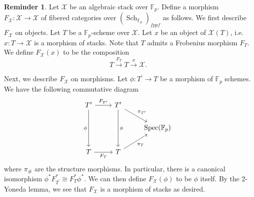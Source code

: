 \documentclass[11pt]{amsart}
\theoremstyle{plain}
\theoremstyle{definition}
\newtheorem{reminder}[theorem]{Reminder}
\numberwithin{equation}{section}
\numberwithin{theorem}{section}
\begin{document}
\begin{reminder}
    Let $\mathcal{X}$ be an algebraic stack over $\mathbb{F}_p$. 
    Define a morphism $F_{\mathcal{X}} \colon \mathcal{X} \to \mathcal{X}$ of fibered categories over $(\operatorname{Sch}_{\mathbb{F}_p})_{fppf}$ as follows. 
    We first describe $F_{\mathcal{X}}$ on objects. 
    Let $T$ be a $\mathbb{F}_p$-scheme over $\mathcal{X}$. Let $x$ be an object of $\mathcal{X}(T)$, i.e. $x\colon T\to \mathcal{X}$ is a morphism of stacks. Note that $T$ admits a Frobenius morphism $F_T$. We define $F_\mathcal{X}(x)$ to be the composition$$T\overset{F_T}{\longrightarrow} T\overset{x}{\longrightarrow}\mathcal{X}.$$

    Next, we describe $F_{\mathcal{X}}$ on morphisms. Let $\phi\colon T^\prime \to T$ be a morphism of $\mathbb{F}_p$ schemes. We have the following commutative diagram
    \begin{displaymath}
        \begin{tikzcd}
            {T^\prime} & {T^\prime} \\
            && {\operatorname{Spec}(\mathbb{F}_p)} \\
            {T} & {T}
            \arrow["{F_{T^\prime}}", from=1-1, to=1-2]
            \arrow["{\phi}"', from=1-1, to=3-1]
            \arrow["{\pi_{T^\prime}}", from=1-2, to=2-3]
            \arrow["{\phi}", from=1-2, to=3-2]
            \arrow["{F_{T}}"', from=3-1, to=3-2]
            \arrow["{\pi_T}"', from=3-2, to=2-3]
        \end{tikzcd}
    \end{displaymath}
    where $\pi_{\#}$ are the structure morphisms. In particular, there is a canonical isomorphism $\phi^*F_{T^\prime}^*\cong F_T^*\phi^*$. We can then define $F_\mathcal{X}(\phi)$ to be $\phi$ itself. By the 2-Yoneda lemma, we see that $F_\mathcal{X}$ is a morphism of stacks as desired.
\end{reminder}
\end{document}
